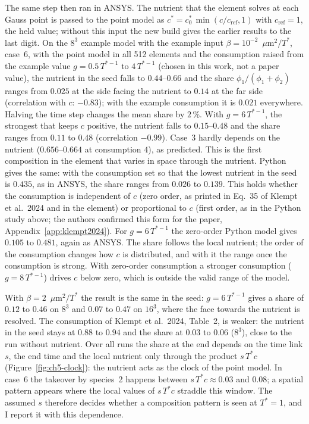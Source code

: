 The same step then ran in ANSYS. The nutrient that the element solves at each
Gauss point is passed to the point model as $c^*=c^*_0\,\min(c/c_\mathrm{ref},1)$
with $c_\mathrm{ref}=1$, the held value; without this input the new build gives
the earlier results to the last digit. On the $8^3$ example model with the
example input $\beta=10^{-2}$~$\mu$m$^2/T^*$, case~6, with
the point model in all 512 elements and the consumption raised from the
example value $g=0.5\,T^{*-1}$ to $4\,T^{*-1}$ (chosen in this work, not a
paper value), the
nutrient in the seed falls to $0.44$--$0.66$ and the share
$\phi_1/(\phi_1+\phi_2)$ ranges from $0.025$ at the side facing the nutrient
to $0.14$ at the far side (correlation with $c$: $-0.83$); with the example
consumption it is $0.021$ everywhere. Halving the time step changes the mean
share by $2\,\%$. With $g=6\,T^{*-1}$, the strongest that keeps $c$ positive,
the nutrient falls to $0.15$--$0.48$ and the share ranges from $0.11$ to
$0.48$ (correlation $-0.99$). Case~3 hardly depends on the nutrient
($0.656$--$0.664$ at consumption $4$), as predicted. This is the first composition in the
element that varies in space through the nutrient. Python gives the same: with the consumption set
so that the lowest nutrient in the seed is $0.435$, as in ANSYS, the share
ranges from $0.026$ to $0.139$. This holds whether the consumption is
independent of $c$ (zero order, as printed in Eq.~35 of Klempt et al.\ 2024 and in the
element) or proportional to $c$ (first order, as in the Python study above;
the authors confirmed this form for the paper, Appendix~\ref{app:klempt2024}). For $g=6\,T^{*-1}$ the zero-order
Python model gives $0.105$ to $0.481$, again as ANSYS. The share follows the
local nutrient; the order of the consumption changes how $c$ is distributed,
and with it the range once the consumption is strong. With zero-order consumption a stronger consumption ($g=8\,T^{*-1}$)
drives $c$ below zero, which is outside the valid range of the model.

With $\beta=2$~$\mu$m$^2/T^*$ the result is the same in the seed: $g=6\,T^{*-1}$
gives a share of $0.12$ to $0.46$ on $8^3$ and $0.07$ to $0.47$ on $16^3$,
where the face towards the nutrient is resolved. The consumption of Klempt et
al.\ 2024, Table~2, is weaker: the nutrient
in the seed stays at $0.88$ to $0.94$ and the share at $0.03$ to $0.06$
($8^3$), close to the run without nutrient. Over all runs the share at the
end depends on the time link $s$, the end time and the local nutrient only
through the product $s\,T^*c$ (Figure~\ref{fig:ch5-clock}): the nutrient acts
as the clock of the point model. In case~6 the takeover by species~2 happens
between $s\,T^*c\approx0.03$ and $0.08$; a spatial pattern appears where the
local values of $s\,T^*c$ straddle this window. The assumed $s$ therefore
decides whether a composition pattern is seen at $T^*=1$, and I report it
with this dependence.


